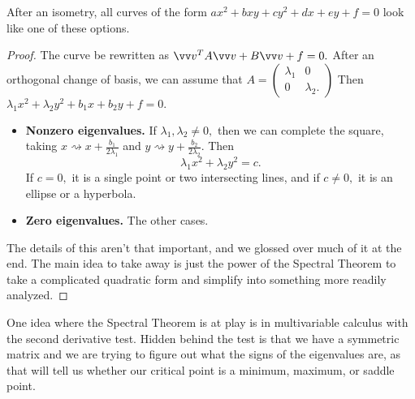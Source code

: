 \begin{theorem}
After an isometry, all curves of the form $ax^2 + bxy + cy^2 + dx + ey + f = 0$ look like one of these options. 
\end{theorem}
\begin{proof}
The curve be rewritten as $\vvv^TA\vvv + B\vvv + f = 0.$ After an orthogonal change of basis, we can assume that $A = \begin{pmatrix}
\lambda_1 & 0 \\ 0 & \lambda_2.
\end{pmatrix}$
Then $\lambda_1x^2 + \lambda_2y^2 + b_1x + b_2y + f = 0.$ 
\begin{itemize}
    \item \textbf{Nonzero eigenvalues.} If $\lambda_1, \lambda_2 \neq 0,$ then we can complete the square, taking $x \rightsquigarrow x + \frac{b_1}{2\lambda_1}$ and $y \rightsquigarrow y + \frac{b_2}{2\lambda_2}$. Then 
    \[
    \lambda_1x^2 + \lambda_2y^2 = c.
    \]
    If $c = 0,$ it is a single point or two intersecting lines, and if $c \neq 0,$ it is an ellipse or a hyperbola. 
    
    \item \textbf{Zero eigenvalues.} The other cases. 
\end{itemize}
The details of this aren't that important, and we glossed over much of it at the end. 
The main idea to take away is just the power of the Spectral Theorem to take a complicated quadratic form and simplify into something more readily analyzed. 
\end{proof}

One idea where the Spectral Theorem is at play is in multivariable calculus with the second derivative test.
Hidden behind the test is that we have a symmetric matrix and we are trying to figure out what the signs of the eigenvalues are, as that will tell us whether our critical point is a minimum, maximum, or saddle point.

\newpage